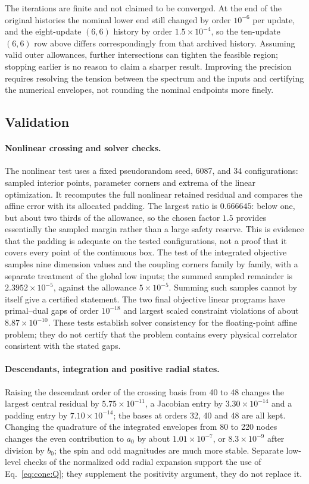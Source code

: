 \documentclass[11pt,a4paper]{article}
\numberwithin{equation}{section}
\newcommand{\sci}[2]{#1\times10^{#2}}
\begin{document}
The iterations are finite and not claimed to be converged. At the end of the original histories the nominal lower end
still changed by order $10^{-6}$ per update, and the eight-update $(6,6)$ history by order $\sci{1.5}{-4}$, so the
ten-update $(6,6)$ row above differs correspondingly from that archived history. Assuming valid outer allowances,
further intersections can tighten the feasible region; stopping earlier is no reason to claim a sharper result.
Improving the precision requires resolving the tension between the spectrum and the inputs and certifying the numerical
envelopes, not rounding the nominal endpoints more finely.

\subsection{Validation}\label{app:cone:validation}
\paragraph{Nonlinear crossing and solver checks.} The nonlinear test uses a fixed pseudorandom seed, 6087, and 34
configurations: sampled interior points, parameter corners and extrema of the linear optimization. It recomputes the
full nonlinear retained residual and compares the affine error with its allocated padding. The largest ratio is
$0.666645$: below one, but about two thirds of the allowance, so the chosen factor $1.5$ provides essentially the
sampled margin rather than a large safety reserve. This is evidence that the padding is adequate on the tested
configurations, not a proof that it covers every point of the continuous box. The test of the integrated objective
samples nine dimension values and the coupling corners family by family, with a separate treatment of the global low
inputs; the summed sampled remainder is $\sci{2.3952}{-5}$, against the allowance $\sci{5}{-5}$. Summing such samples
cannot by itself give a certified statement. The two final objective linear programs have primal--dual gaps of order
$10^{-18}$ and largest scaled constraint violations of about $\sci{8.87}{-10}$. These tests establish solver
consistency for the floating-point affine problem; they do not certify that the problem contains every physical
correlator consistent with the stated gaps.

\paragraph{Descendants, integration and positive radial states.} Raising the descendant order of the crossing basis
from 40 to 48 changes the largest central residual by $\sci{5.75}{-11}$, a Jacobian entry by $\sci{3.30}{-14}$ and a
padding entry by $\sci{7.10}{-14}$; the bases at orders 32, 40 and 48 are all kept. Changing the quadrature of the
integrated envelopes from 80 to 220 nodes changes the even contribution to $a_0$ by about $\sci{1.01}{-7}$, or
$\sci{8.3}{-9}$ after division by $b_0$; the spin and odd magnitudes are much more stable. Separate low-level checks of the
normalized odd radial expansion support the use of Eq.~\eqref{eq:cone:Q}; they supplement the positivity argument, they
do not replace it.
\end{document}
